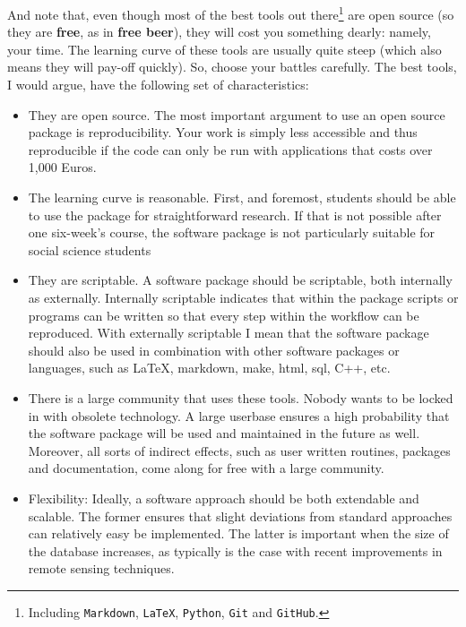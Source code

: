 \documentclass[]{article}
\providecommand{\tightlist}{%
  \setlength{\itemsep}{0pt}\setlength{\parskip}{0pt}}
\let\rmarkdownfootnote\footnote%
\def\footnote{\protect\rmarkdownfootnote}
\theoremstyle{definition}
\theoremstyle{definition}
\theoremstyle{definition}
\theoremstyle{remark}
\begin{document}
And note that, even though most of the best tools out there\footnote{Including
  \texttt{Markdown}, \texttt{LaTeX}, \texttt{Python}, \texttt{Git} and
  \texttt{GitHub}.} are open source (so they are \textbf{free}, as in
\textbf{free beer}), they will cost you something dearly: namely, your
time. The learning curve of these tools are usually quite steep (which
also means they will pay-off quickly). So, choose your battles
carefully. The best tools, I would argue, have the following set of
characteristics:

\begin{itemize}
\tightlist
\item
  They are open source. The most important argument to use an open
  source package is reproducibility. Your work is simply less accessible
  and thus reproducible if the code can only be run with applications
  that costs over 1,000 Euros.
\item
  The learning curve is reasonable. First, and foremost, students should
  be able to use the package for straightforward research. If that is
  not possible after one six-week's course, the software package is not
  particularly suitable for social science students
\item
  They are scriptable. A software package should be scriptable, both
  internally as externally. Internally scriptable indicates that within
  the package scripts or programs can be written so that every step
  within the workflow can be reproduced. With externally scriptable I
  mean that the software package should also be used in combination with
  other software packages or languages, such as LaTeX, markdown, make,
  html, sql, C++, etc.
\item
  There is a large community that uses these tools. Nobody wants to be
  locked in with obsolete technology. A large userbase ensures a high
  probability that the software package will be used and maintained in
  the future as well. Moreover, all sorts of indirect effects, such as
  user written routines, packages and documentation, come along for free
  with a large community.
\item
  Flexibility: Ideally, a software approach should be both extendable
  and scalable. The former ensures that slight deviations from standard
  approaches can relatively easy be implemented. The latter is important
  when the size of the database increases, as typically is the case with
  recent improvements in remote sensing techniques.
\end{itemize}
\end{document}
